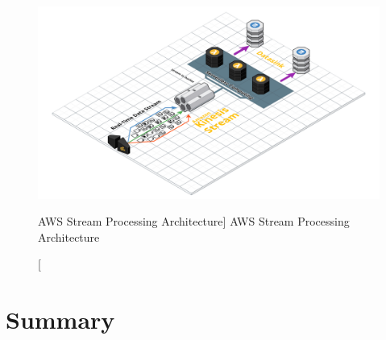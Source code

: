 \begin{figure}[ht]
    \includegraphics[width=\linewidth]{images/streaming/streamingaws.png}\centering
    \caption
    [AWS Stream Processing Architecture]
    {AWS Stream Processing Architecture}
    \label{fig:awsStreamingArchitecture}
\end{figure}


\section{Summary}
